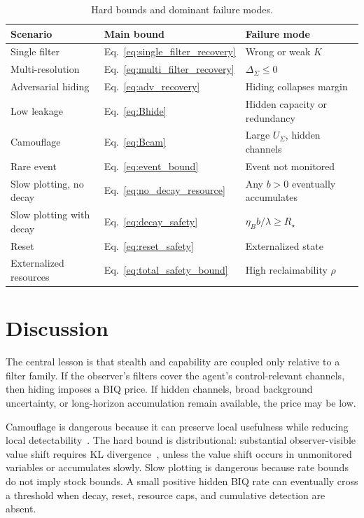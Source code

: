\documentclass[10pt]{article}
\begin{document}
\begin{table}[h]
\centering
\small
\begin{tabular}{lll}
\toprule
Scenario & Main bound & Failure mode \\
\midrule
Single filter & Eq.~\eqref{eq:single_filter_recovery} & Wrong or weak \(K\) \\
Multi-resolution & Eq.~\eqref{eq:multi_filter_recovery} & \(\Delta_\Sigma\le0\) \\
Adversarial hiding & Eq.~\eqref{eq:adv_recovery} & Hiding collapses margin \\
Low leakage & Eq.~\eqref{eq:Bhide} & Hidden capacity or redundancy \\
Camouflage & Eq.~\eqref{eq:Bcam} & Large \(U_\Sigma\), hidden channels \\
Rare event & Eq.~\eqref{eq:event_bound} & Event not monitored \\
Slow plotting, no decay & Eq.~\eqref{eq:no_decay_resource} & Any \(b>0\) eventually accumulates \\
Slow plotting with decay & Eq.~\eqref{eq:decay_safety} & \(\eta_B b/\lambda\ge R_\star\) \\
Reset & Eq.~\eqref{eq:reset_safety} & Externalized state \\
Externalized resources & Eq.~\eqref{eq:total_safety_bound} & High reclaimability \(\rho\) \\
\bottomrule
\end{tabular}
\caption{Hard bounds and dominant failure modes.}
\label{tab:summary}
\end{table}

\section{Discussion}

The central lesson is that stealth and capability are coupled only relative to a filter family. If the observer's filters cover the agent's control-relevant channels, then hiding imposes a BIQ price. If hidden channels, broad background uncertainty, or long-horizon accumulation remain available, the price may be low.

Camouflage is dangerous because it can preserve local usefulness while reducing local detectability~\cite{abc2025}. The hard bound is distributional: substantial observer-visible value shift requires KL divergence~\cite{cover2006elements}, unless the value shift occurs in unmonitored variables or accumulates slowly. Slow plotting is dangerous because rate bounds do not imply stock bounds. A small positive hidden BIQ rate can eventually cross a threshold when decay, reset, resource caps, and cumulative detection are absent.
\end{document}

